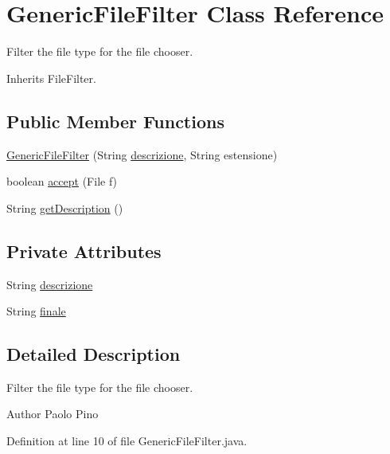 \hypertarget{class_generic_file_filter}{\section{Generic\-File\-Filter Class Reference}
\label{class_generic_file_filter}
}


Filter the file type for the file chooser.  




Inherits File\-Filter.

\subsection*{Public Member Functions}
\begin{DoxyCompactItemize}
\item 
\hyperlink{class_generic_file_filter_a96d78c6c212bfbf0be95a4d10937a89d}{Generic\-File\-Filter} (String \hyperlink{class_generic_file_filter_a9953e3b3aa3dee91452cb9c2ad80822b}{descrizione}, String estensione)
\item 
boolean \hyperlink{class_generic_file_filter_a03eee4e0d87525559746265dc63c9319}{accept} (File f)
\item 
String \hyperlink{class_generic_file_filter_a6918acbc60f5dcff51cb92a9487e2493}{get\-Description} ()
\end{DoxyCompactItemize}
\subsection*{Private Attributes}
\begin{DoxyCompactItemize}
\item 
String \hyperlink{class_generic_file_filter_a9953e3b3aa3dee91452cb9c2ad80822b}{descrizione}
\item 
String \hyperlink{class_generic_file_filter_a9468f04e6ea80d41e6bc69b59769b751}{finale}
\end{DoxyCompactItemize}


\subsection{Detailed Description}
Filter the file type for the file chooser. 

\begin{DoxyAuthor}{Author}
Paolo Pino 
\end{DoxyAuthor}


Definition at line 10 of file Generic\-File\-Filter.\-java.



